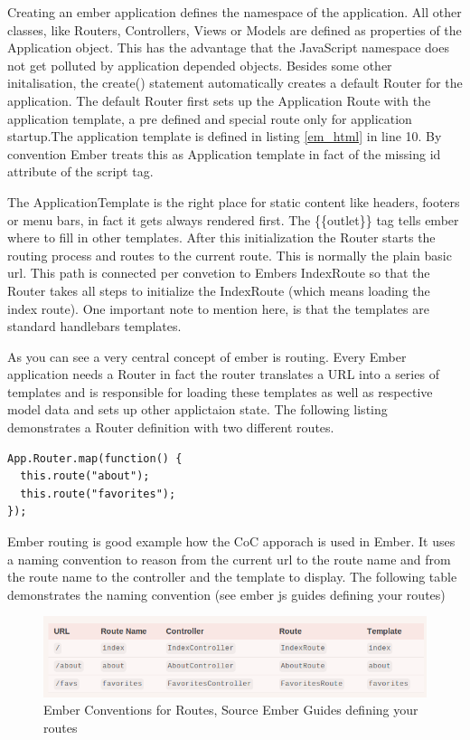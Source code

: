 Creating an ember application defines the namespace of the application. All other classes, like Routers, Controllers, Views or Models are defined as properties of the Application object. This has the advantage that the JavaScript namespace does not get polluted by application depended objects. Besides some other initalisation, the create() statement automatically creates a default Router for the application. The default Router first sets up the Application Route with the application template, a pre defined and special route only for application startup.The application template is defined in listing \ref{em_html} in line 10. By convention Ember treats this as Application template in fact of the missing id attribute of the script tag. 

The ApplicationTemplate is the right place for static content like headers, footers or menu bars, in fact it gets always rendered first. The \{\{outlet\}\} tag tells ember where to fill in other templates. After this initialization the Router starts the routing process and routes to the current route. This is normally the plain basic url. This path is connected per convetion to Embers IndexRoute so that the Router takes all steps to initialize the IndexRoute (which means loading the index route). One important note to mention here, is that the templates are standard handlebars templates.

As you can see a very central concept of ember is routing. Every Ember application needs a Router in fact the router translates a URL into a series of templates and is responsible for loading these templates as well as respective model data and sets up other applictaion state. The following listing demonstrates a Router definition with two different routes. 
\begin{lstlisting}[caption=app.js]
App.Router.map(function() {
  this.route("about");
  this.route("favorites");
});
\end{lstlisting}

Ember routing is good example how the CoC apporach is used in Ember. It uses a naming convention to reason from the current url to the route name and from the route name to the controller and the template to display. The following table demonstrates the naming convention (see ember js guides defining your routes)  

\begin{figure}
	\centering	\includegraphics[width=1.0\textwidth]{./img/ember_routes_conventions.png}
	\caption{Ember Conventions for Routes, Source Ember Guides defining your routes}
	\label{fig:ember_routes}
\end{figure}


